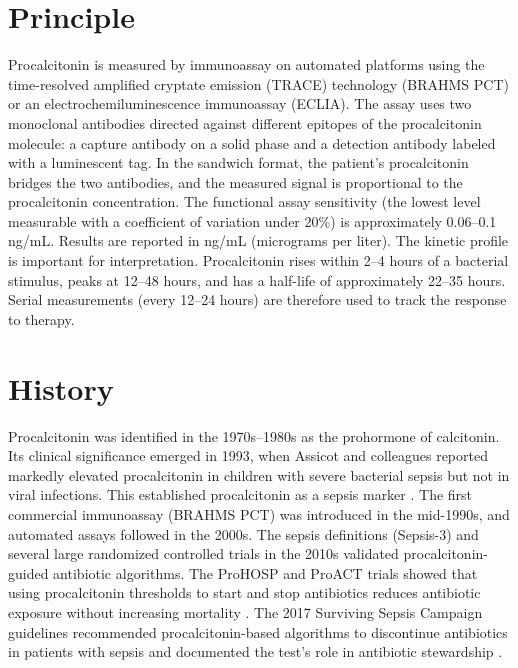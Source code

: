 \section*{Principle}
Procalcitonin is measured by immunoassay on automated platforms using the time-resolved amplified cryptate emission (TRACE) technology (BRAHMS PCT) or an electrochemiluminescence immunoassay (ECLIA). The assay uses two monoclonal antibodies directed against different epitopes of the procalcitonin molecule: a capture antibody on a solid phase and a detection antibody labeled with a luminescent tag. In the sandwich format, the patient's procalcitonin bridges the two antibodies, and the measured signal is proportional to the procalcitonin concentration. The functional assay sensitivity (the lowest level measurable with a coefficient of variation under 20\%) is approximately 0.06--0.1 ng/mL. Results are reported in ng/mL (micrograms per liter). The kinetic profile is important for interpretation. Procalcitonin rises within 2--4 hours of a bacterial stimulus, peaks at 12--48 hours, and has a half-life of approximately 22--35 hours. Serial measurements (every 12--24 hours) are therefore used to track the response to therapy.

\section*{History}
Procalcitonin was identified in the 1970s--1980s as the prohormone of calcitonin. Its clinical significance emerged in 1993, when Assicot and colleagues reported markedly elevated procalcitonin in children with severe bacterial sepsis but not in viral infections. This established procalcitonin as a sepsis marker \cite{assicot1993high}. The first commercial immunoassay (BRAHMS PCT) was introduced in the mid-1990s, and automated assays followed in the 2000s. The sepsis definitions (Sepsis-3) and several large randomized controlled trials in the 2010s validated procalcitonin-guided antibiotic algorithms. The ProHOSP and ProACT trials showed that using procalcitonin thresholds to start and stop antibiotics reduces antibiotic exposure without increasing mortality \cite{huang2018procalcitonin}. The 2017 Surviving Sepsis Campaign guidelines recommended procalcitonin-based algorithms to discontinue antibiotics in patients with sepsis and documented the test's role in antibiotic stewardship \cite{rhodes2017surviving}.

